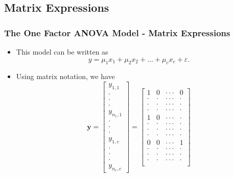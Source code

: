 \subsection{Matrix Expressions}
    \begin{frame}[shrink=2]
 \frametitle{The One Factor ANOVA Model - Matrix Expressions}
   \begin{itemize}
    \item This model can be written as
\begin{equation*}
y=\mu _{1}x_{1}+\mu _{2}x_{2}+\ldots +\mu _{c}x_{c}+\varepsilon.
\end{equation*}
\item Using matrix notation, we have
\begin{equation*}
\mathbf{y}=%
\begin{bmatrix}
y_{1,1} \\
\cdot  \\
\cdot  \\
\cdot  \\
y_{n_{1},1} \\
\cdot  \\
\cdot  \\
\cdot  \\
y_{1,c} \\
\cdot  \\
\cdot  \\
\cdot  \\
y_{n_{c},c}%
\end{bmatrix}%
=%
\begin{bmatrix}
1 & 0 & \cdot \cdot \cdot  & 0 \\
\cdot  & \cdot  & \cdot \cdot \cdot  & \cdot  \\
\cdot  & \cdot  & \cdot \cdot \cdot  & \cdot  \\
\cdot  & \cdot  & \cdot \cdot \cdot  & \cdot  \\
1 & 0 & \cdot \cdot \cdot  & \cdot  \\
\cdot  & \cdot  & \cdot \cdot \cdot  & \cdot  \\
\cdot  & \cdot  & \cdot \cdot \cdot  & \cdot  \\
\cdot  & \cdot  & \cdot \cdot \cdot  & \cdot  \\
0 & 0 & \cdot \cdot \cdot  & 1 \\
\cdot  & \cdot  & \cdot \cdot \cdot  & \cdot  \\
\cdot  & \cdot  & \cdot \cdot \cdot  & \cdot  \\
\cdot  & \cdot  & \cdot \cdot \cdot  & \cdot  \\

\end{bmatrix}
\end{equation*}
\end{itemize}
\end{frame}
